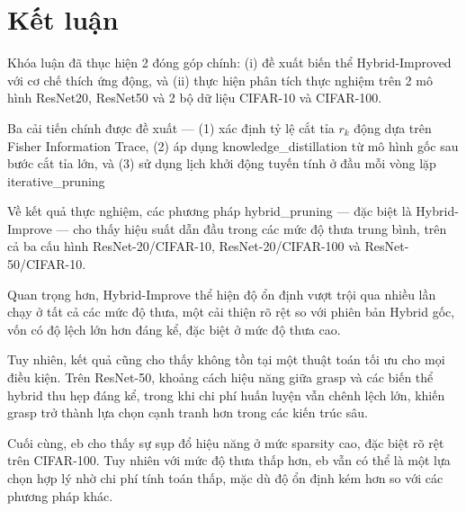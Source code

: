 \chapter*{Kết luận}
Khóa luận đã thục hiện 2 đóng góp chính: 
(i) đề xuất biến thể Hybrid-Improved với cơ chế thích ứng động, và 
(ii) thực hiện phân tích thực nghiệm trên 2 mô hình ResNet20, ResNet50 và 2 bộ dữ liệu CIFAR-10 và CIFAR-100.

Ba cải tiến chính được đề xuất — (1) xác định tỷ lệ cắt tỉa $r_k$ động dựa trên Fisher Information Trace, 
(2) áp dụng \gls{knowledge_distillation} từ mô hình gốc sau bước cắt tỉa lớn, và 
(3) sử dụng lịch khởi động tuyến tính ở đầu mỗi vòng lặp \gls{iterative_pruning}

Về kết quả thực nghiệm, các phương pháp \gls{hybrid_pruning} — đặc biệt là Hybrid-Improve — 
cho thấy hiệu suất dẫn đầu trong các mức độ thưa trung bình, 
trên cả ba cấu hình ResNet-20/CIFAR-10, ResNet-20/CIFAR-100 và ResNet-50/CIFAR-10. 

Quan trọng hơn, Hybrid-Improve thể hiện độ ổn định vượt trội qua nhiều lần chạy ở tất cả các mức độ thưa, 
một cải thiện rõ rệt so với phiên bản Hybrid gốc, vốn có độ lệch lớn hơn đáng kể, đặc biệt ở mức độ thưa cao.

Tuy nhiên, kết quả cũng cho thấy không tồn tại một thuật toán tối ưu cho mọi điều kiện. 
Trên ResNet-50, khoảng cách hiệu năng giữa \gls{grasp} và các biến thể hybrid thu hẹp đáng kể, 
trong khi chi phí huấn luyện vẫn chênh lệch lớn, khiến \gls{grasp} trở thành lựa chọn cạnh tranh hơn trong các kiến trúc sâu.

Cuối cùng, \gls{eb} cho thấy sự sụp đổ hiệu năng ở mức \gls{sparsity} cao, đặc biệt rõ rệt trên CIFAR-100. 
Tuy nhiên với mức độ thưa thấp hơn, \gls{eb} vẫn có thể là một lựa chọn hợp lý nhờ chi phí tính toán thấp, mặc dù độ ổn định kém hơn so với các phương pháp khác.
